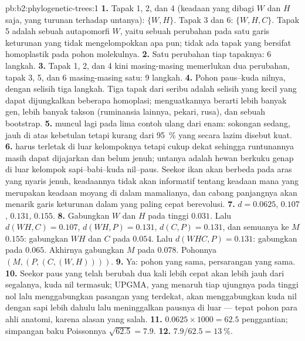 \begin{solution}{pb:b2:phylogenetic-trees:1}
\textbf{1.} Tapak 1, 2, dan 4 (keadaan yang dibagi $W$ dan $H$ saja,
yang turunan terhadap untanya):  $\{W,H\}$. Tapak 3
dan 6:  $\{W,H,C\}$. Tapak 5 adalah sebuah autapomorfi
$W$, yaitu sebuah perubahan pada satu garis keturunan yang tidak
mengelompokkan apa pun; tidak ada tapak yang bersifat homoplastik pada
pohon molekulnya.
\textbf{2.} Satu perubahan tiap tapaknya: 6 langkah.
\textbf{3.} Tapak 1, 2, dan 4 kini masing-masing memerlukan dua
perubahan, tapak 3, 5, dan 6 masing-masing satu: 9 langkah.
\textbf{4.} Pohon paus--kuda nilnya, dengan selisih tiga langkah. Tiga
tapak dari seribu adalah selisih yang kecil yang dapat dijungkalkan
beberapa homoplasi; menguatkannya berarti lebih banyak gen, lebih
banyak takson (ruminansia lainnya, pekari, rusa), dan sebuah bootstrap.
\textbf{5.}  muncul lagi pada lima contoh ulang dari enam:
sokongan sedang, jauh di atas kebetulan tetapi kurang dari \qty{95}{\%}
yang secara lazim disebut kuat.
\textbf{6.}  harus terletak di luar kelompoknya tetapi
cukup dekat sehingga runtunannya masih dapat dijajarkan dan belum
jenuh; untanya adalah hewan berkuku genap di luar kelompok
sapi--babi--kuda nil--paus. Seekor ikan akan berbeda pada aras yang
nyaris jenuh, keadaannya tidak akan informatif tentang keadaan mana
yang merupakan keadaan moyang di dalam mamalianya, dan cabang panjangnya
akan menarik garis keturunan dalam yang paling cepat berevolusi.
\textbf{7.} $d = 0.0625$, $0.107$, $0.131$, $0.155$.
\textbf{8.} Gabungkan $W$ dan $H$ pada tinggi $0.031$. Lalu $d(WH,C) =
0.107$, $d(WH,P) = 0.131$, $d(C,P) = 0.131$, dan semuanya ke $M$
$0.155$: gabungkan $WH$ dan $C$ pada $0.054$. Lalu $d(WHC,P) = 0.131$:
gabungkan pada $0.065$. Akhirnya gabungkan $M$ pada $0.078$. Pohonnya
$(M,(P,(C,(W,H))))$.
\textbf{9.} Ya: pohon yang sama, persarangan yang sama.
\textbf{10.} Seekor paus yang telah berubah dua kali lebih cepat akan
lebih jauh dari segalanya, kuda nil termasuk; UPGMA, yang menaruh tiap
ujungnya pada tinggi nol lalu menggabungkan pasangan yang terdekat,
akan menggabungkan kuda nil dengan sapi lebih dahulu lalu meninggalkan
pausnya di luar --- tepat pohon para ahli anatomi, karena alasan yang
salah.
\textbf{11.} $0.0625\times 1000 = 62.5$ penggantian; simpangan baku
Poissonnya $\sqrt{62.5} = 7.9$.
\textbf{12.} $7.9/62.5 = \qty{13}{\%}$.

\end{solution}
